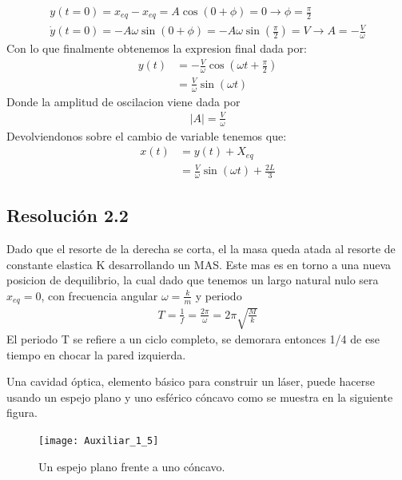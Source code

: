 \documentclass[
  11pt,
  letterpaper,
   addpoints,
   answers
  ]{exam}
\begin{document}
\begin{questions}
\begin{solution}
\begin{align}
  y(t=0) = x_{eq} - x_{eq} =  A\cos(0 + \phi) = 0  \rightarrow \phi= \frac{\pi}{2}\\
  \dot{y}(t=0) = -A\omega\sin(0+ \phi) = -A\omega\sin\left(\frac{\pi}{2}\right)= V \rightarrow A = - \frac{V}{\omega}
\end{align}
Con lo que finalmente obtenemos la expresion final dada por:
\begin{align}
    y(t) &= -\frac{V}{\omega} \cos\left(\omega t + \frac{\pi}{2}\right)\\
        &= \frac{V}{\omega} \sin(\omega t)
\end{align}
Donde la amplitud de oscilacion viene dada por
\begin{align}
    |A| = \frac{V}{\omega}
\end{align}
Devolviendonos sobre el cambio de variable tenemos que:
\begin{align}
    x(t) &= y(t) + X_{eq}\\
    &= \frac{V}{\omega} \sin(\omega t) + \frac{2L}{3}
\end{align}
\subsection*{Resolución 2.2}
Dado que el resorte de la derecha se corta, el la masa queda atada al resorte de constante elastica K desarrollando un MAS. Este mas es en torno a una nueva posicion de dequilibrio, la cual dado que tenemos un largo natural nulo sera $x_{eq} = 0$, con frecuencia angular $\omega = \frac{k}{m}$ y periodo 
\begin{align}
    T= \frac{1}{f} = \frac{2\pi}{\omega} = 2\pi \sqrt{\frac{M}{k}}
\end{align}
El periodo T se refiere a un ciclo completo, se demorara entonces 1/4 de ese tiempo en chocar la pared izquierda.

\end{solution}
\question Una cavidad óptica, elemento básico para construir un láser, puede hacerse usando un espejo plano y uno esférico cóncavo como se muestra en la siguiente figura.

\begin{figure}[h!]
    \centering
    \texttt{[image: Auxiliar\_1\_5]}
    \caption{Un espejo plano frente a uno cóncavo.}
    \label{fig:cavidad_optica}
\end{figure}


\end{questions}
\end{document}
